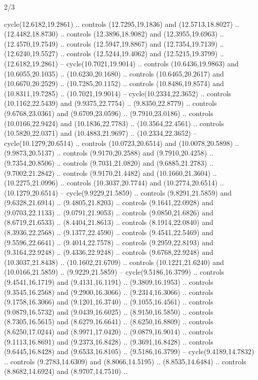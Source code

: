 \begin{flagdescription}{2/3}
\begin{scope}[yshift=\flagwidth,scale=\flagwidth/1241.93737]
\begin{scope}[y=-1mm, x=1mm,draw=gold,fill=blue,line join=miter,miter limit=4,line width=1.8\lw]
{  cycle(12.6182,19.2861) .. controls (12.7295,19.1836) and (12.5713,18.8027) ..
  (12.4482,18.8730) .. controls (12.3896,18.9082) and (12.3955,19.6963) ..
  (12.4570,19.7549) .. controls (12.5947,19.8867) and (12.7354,19.7139) ..
  (12.6240,19.5527) .. controls (12.5244,19.4062) and (12.5215,19.3799) ..
  (12.6182,19.2861) -- cycle(10.7021,19.9014) .. controls (10.6436,19.9863) and
  (10.6055,20.1035) .. (10.6230,20.1680) .. controls (10.6465,20.2617) and
  (10.6670,20.2529) .. (10.7285,20.1152) .. controls (10.8486,19.8574) and
  (10.8311,19.7285) .. (10.7021,19.9014) -- cycle(10.2334,22.3652) .. controls
  (10.1162,22.5439) and (9.9375,22.7754) .. (9.8350,22.8779) .. controls
  (9.6768,23.0361) and (9.6709,23.0596) .. (9.7910,23.0186) .. controls
  (10.0166,22.9424) and (10.1836,22.7783) .. (10.3564,22.4561) .. controls
  (10.5820,22.0371) and (10.4883,21.9697) .. (10.2334,22.3652) --
  cycle(10.1279,20.6514) .. controls (10.0723,20.6514) and (10.0078,20.5898) ..
  (9.9873,20.5137) .. controls (9.9170,20.2588) and (9.7910,20.4258) ..
  (9.7354,20.8506) .. controls (9.7031,21.0820) and (9.6885,21.2783) ..
  (9.7002,21.2842) .. controls (9.9170,21.4482) and (10.1660,21.3604) ..
  (10.2275,21.0996) .. controls (10.3037,20.7744) and (10.2774,20.6514) ..
  (10.1279,20.6514) -- cycle(9.9229,21.5859) .. controls (9.8291,21.5859) and
  (9.6328,21.6914) .. (9.4805,21.8203) .. controls (9.1641,22.0928) and
  (9.0703,22.1133) .. (9.0791,21.9053) .. controls (9.0850,21.6826) and
  (8.6719,21.6533) .. (8.4404,21.8613) .. controls (8.1914,22.0840) and
  (8.3936,22.2568) .. (9.1377,22.4590) .. controls (9.4541,22.5469) and
  (9.5596,22.6641) .. (9.4014,22.7578) .. controls (9.2959,22.8193) and
  (9.3164,22.9248) .. (9.4336,22.9248) .. controls (9.6768,22.9248) and
  (10.3037,21.8438) .. (10.1602,21.6709) .. controls (10.1221,21.6240) and
  (10.0166,21.5859) .. (9.9229,21.5859) -- cycle(9.5186,16.3799) .. controls
  (9.4541,16.1719) and (9.4131,16.1191) .. (9.3809,16.1953) .. controls
  (9.3545,16.2568) and (9.2900,16.3066) .. (9.2314,16.3066) .. controls
  (9.1758,16.3066) and (9.1201,16.3740) .. (9.1055,16.4561) .. controls
  (9.0879,16.5732) and (9.0439,16.6025) .. (8.9150,16.5850) .. controls
  (8.7305,16.5615) and (8.6279,16.6641) .. (8.6250,16.8809) .. controls
  (8.6250,17.0244) and (8.9971,17.0420) .. (9.0879,16.9014) .. controls
  (9.1113,16.8691) and (9.2373,16.8428) .. (9.3691,16.8428) .. controls
  (9.6445,16.8428) and (9.6533,16.8105) .. (9.5186,16.3799) --
  cycle(9.4189,14.7832) .. controls (9.2783,14.6309) and (8.8066,14.5195) ..
  (8.8535,14.6484) .. controls (8.8682,14.6924) and (8.9707,14.7510) ..
}
\end{scope}
\end{scope}
\end{flagdescription}

